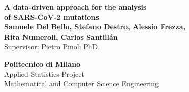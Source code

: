 \documentclass[a0,landscape]{a0poster}
\begin{document}


\begin{minipage}[b]{0.55\linewidth}
\veryHuge \color{NavyBlue} \textbf{A data-driven approach for the analysis \\of SARS-CoV-2 mutations}\\[1cm] %
\huge \textbf{Samuele Del Bello, Stefano Destro, Alessio Frezza, \\Rita Numeroli, Carlos Santillán}\\ %
\huge Supervisor: Pietro Pinoli PhD.\ %
\end{minipage}
%
\begin{minipage}[b]{0.25\linewidth}
\color{DarkSlateGray}\Large \textbf{Politecnico di Milano}\\
Applied Statistics Project\\ %
Mathematical and Computer Science Engineering\\
\end{minipage}

\vspace{1cm} %

\end{document}
